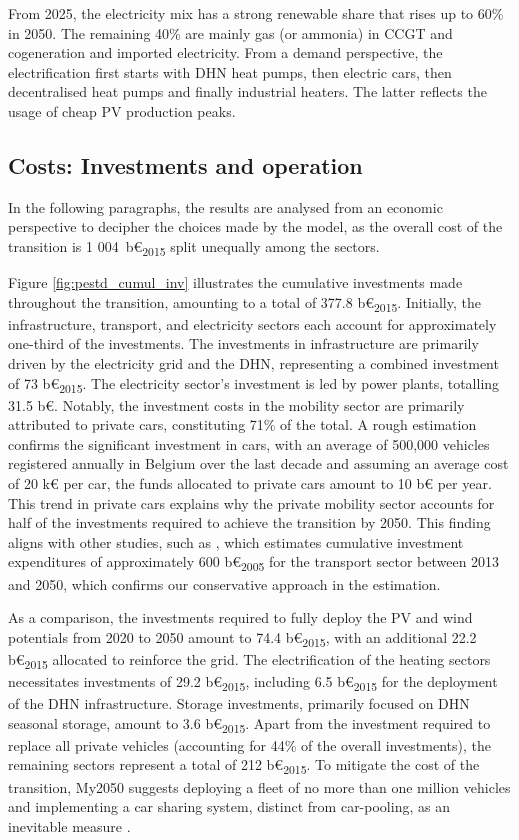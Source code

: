 From 2025, the electricity mix has a strong renewable share that rises up to 60\% in 2050. The remaining 40\% are mainly gas (or ammonia) in \gls{CCGT} and cogeneration and imported electricity. From a demand perspective, the electrification first starts with \gls{DHN} heat pumps, then electric cars, then decentralised heat pumps and finally industrial heaters. The latter reflects the usage of cheap \gls{PV} production peaks. 

\subsection{Costs: Investments and operation}

In the following paragraphs, the results are analysed from an economic perspective to decipher the choices made by the model, as the overall cost of the transition is 1 004~b€\textsubscript{2015} split unequally among the sectors. 

Figure \ref{fig:pestd_cumul_inv} illustrates the cumulative investments made throughout the transition, amounting to a total of 377.8 b€\textsubscript{2015}. Initially, the infrastructure, transport, and electricity sectors each account for approximately one-third of the investments. The investments in infrastructure are primarily driven by the electricity grid and the \acrfull{DHN}, representing a combined investment of 73 b€\textsubscript{2015}. The electricity sector's investment is led by power plants, totalling 31.5 b€. Notably, the investment costs in the mobility sector are primarily attributed to private cars, constituting 71\% of the total. A rough estimation confirms the significant investment in cars, with an average of 500,000 vehicles registered annually in Belgium over the last decade \cite{febiac2021datadigest} and assuming an average cost of 20 k€ per car, the funds allocated to private cars amount to 10 b€ per year. This trend in private cars explains why the private mobility sector accounts for half of the investments required to achieve the transition by 2050. This finding aligns with other studies, such as \citet{Devogelaer2013}, which estimates cumulative investment expenditures of approximately 600 b€\textsubscript{2005} for the transport sector between 2013 and 2050, which confirms our conservative approach in the estimation.


As a comparison, the investments required to fully deploy the PV and wind potentials from 2020 to 2050 amount to 74.4 b€\textsubscript{2015}, with an additional 22.2 b€\textsubscript{2015} allocated to reinforce the grid. The electrification of the heating sectors necessitates investments of 29.2 b€\textsubscript{2015}, including 6.5 b€\textsubscript{2015} for the deployment of the \gls{DHN} infrastructure. Storage investments, primarily focused on \gls{DHN} seasonal storage, amount to 3.6 b€\textsubscript{2015}. Apart from the investment required to replace all private vehicles (accounting for 44\% of the overall investments), the remaining sectors represent a total of 212 b€\textsubscript{2015}. To mitigate the cost of the transition, My2050 suggests deploying a fleet of no more than one million vehicles and implementing a car sharing system, distinct from car-pooling, as an inevitable measure \cite{My2050}.

